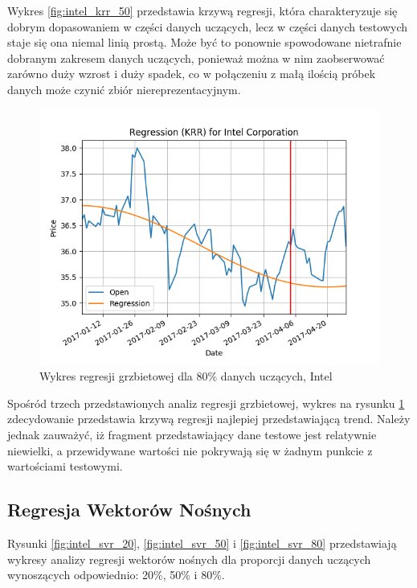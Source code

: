 Wykres \ref{fig:intel_krr_50} przedstawia krzywą regresji, która charakteryzuje się dobrym dopasowaniem w części danych uczących, lecz w części danych testowych staje się ona niemal linią prostą.
Może być to ponownie spowodowane nietrafnie dobranym zakresem danych uczących, ponieważ można w nim zaobserwować zarówno duży wzrost i duży spadek, co w połączeniu z małą ilością próbek danych może czynić zbiór niereprezentacyjnym.\\

\begin{figure}[h!]
\centering
\includegraphics[width=150mm]{pictures/plots/intel_krr_80.png}
\caption{Wykres regresji grzbietowej dla 80\% danych uczących, Intel}
\label{fig:intel_krr_80}
\end{figure}

Spośród trzech przedstawionych analiz regresji grzbietowej, wykres na rysunku \ref{fig:intel_krr_80} zdecydowanie przedstawia krzywą regresji najlepiej przedstawiającą trend.
Należy jednak zauważyć, iż fragment przedstawiający dane testowe jest relatywnie niewielki, a przewidywane wartości nie pokrywają się w żadnym punkcie z wartościami testowymi.\\

\subsection{Regresja Wektorów Nośnych}

Rysunki \ref{fig:intel_svr_20}, \ref{fig:intel_svr_50} i \ref{fig:intel_svr_80} przedstawiają wykresy analizy regresji wektorów nośnych dla proporcji danych uczących wynoszących odpowiednio: 20\%, 50\% i 80\%.\\

